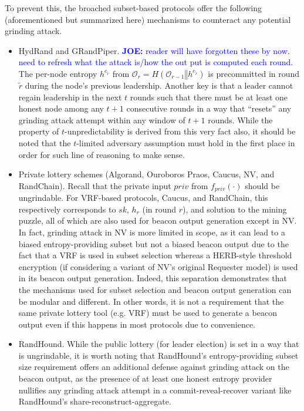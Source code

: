 \documentclass[letterpaper,twocolumn,10pt]{article}
\theoremstyle{definition}
\theoremstyle{remark}
\newcommand{\joenote}[1]{\textcolor{blue}{\textbf{JOE:} #1}}
\begin{document}
To prevent this, the broached subset-based protocols offer the following (aforementioned but summarized here) mechanisms to counteract any potential grinding attack.
\begin{itemize}
\item HydRand and GRandPiper. \joenote{reader will have forgotten these by now. need to refresh what the attack is/how the out put is computed each round.} The per-node entropy $h^{e_{\tilde{r}}}$ from $\mathcal{O}_r = H(\mathcal{O}_{r - 1} \mathbin\Vert h^{e_{\tilde{r}}})$ is precommitted in round $\tilde{r}$ during the node's previous leadership. Another key is that a leader cannot regain leadership in the next $t$ rounds such that there must be at least one honest node among any $t + 1$ consecutive rounds in a way that ``resets'' any grinding attack attempt within any window of $t + 1$ rounds. While the property of $t$-unpredictability is derived from this very fact also, it should be noted that the $t$-limited adversary assumption must hold in the first place in order for such line of reasoning to make sense.
\item Private lottery schemes (Algorand, Ouroboros Praos, Caucus, NV, and RandChain). Recall that the private input $priv$ from $f_{priv}(\cdot)$ should be ungrindable. For VRF-based protocols, Caucus, and RandChain, this respectively corresponds to $sk$, $h_r$ (in round $r$), and solution to the mining puzzle, all of which are also used for beacon output generation except in NV. In fact, grinding attack in NV is more limited in scope, as it can lead to a biased entropy-providing subset but not a biased beacon output due to the fact that a VRF is used in subset selection whereas a HERB-style threshold encryption (if considering a variant of NV's original Requester model) is used in its beacon output generation. Indeed, this separation demonstrates that the mechanisms used for subset selection and beacon output generation can be modular and different. In other words, it is not a requirement that the same private lottery tool (e.g. VRF) must be used to generate a beacon output even if this happens in most protocols due to convenience.
\item RandHound. While the public lottery (for leader election) is set in a way that is ungrindable, it is worth noting that RandHound's entropy-providing subset size requirement offers an additional defense against grinding attack on the beacon output, as the presence of at least one honest entropy provider nullifies any grinding attack attempt in a commit-reveal-recover variant like RandHound's share-reconstruct-aggregate.

\end{itemize}
\end{document}
